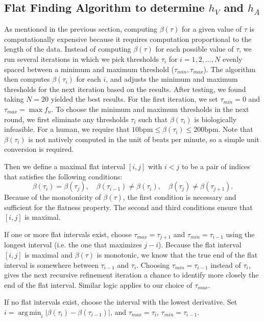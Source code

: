 \documentclass[conference]{IEEEtran}
\newcommand{\APH}{\ensuremath{h_A}}
\newcommand{\VPH}{\ensuremath{h_V}}
\DeclareMathOperator*{\argmin}{arg\,min}
\begin{document}
\subsection{Flat Finding Algorithm to determine \VPH{} and \APH{}}
As mentioned in the previous section, computing $\beta(\tau)$ for a given value of $\tau$
is computationally expensive because it requires computation proportional to the length of the data.
Instead of computing $\beta(\tau)$ for each possible value of $\tau$, we run several iterations in which
we pick thresholds $\tau_i$ for $i = 1, 2, \dots, N$ evenly spaced
between a minimum and maximum threshold ($\tau_{min}, \tau_{max}$).  The algorithm then computes
$\beta(\tau_i)$ for each $i$, and adjusts the minimum and
maximum thresholds for the next iteration based on the
results.
After testing, we found taking $N=20$ yielded the best results.
For the first iteration, we set
$\tau_{min} = 0$ and $\tau_{max} = \max f_n$. 
To choose the minimum and maximum thresholds in
the next round, we first eliminate any thresholds $\tau_i$
such that $\beta(\tau_i)$ is biologically infeasible. 
For a human, we require that $10 \text{bpm} \le \beta(\tau_i) \le 200 \text{bpm}$.
Note that $\beta(\tau_i)$ is not natively computed in the unit of beats per minute, so a simple unit conversion is required.

Then we define a maximal flat interval $[i,j]$ with $i<j$ to be a pair of indices that satisfies the following conditions:
\begin{equation*}
	\beta(\tau_i) = \beta(\tau_j),\quad \beta(\tau_{i-1}) \ne \beta(\tau_i),\quad \beta(\tau_j) \ne \beta(\tau_{j+1}).
\end{equation*}
Because of the monotonicity of $\beta(\tau)$, the first condition is necessary and sufficient for the flatness property.
The second and third conditions ensure that $[i,j]$ is maximal.

If one or more flat intervals exist, choose $\tau_{max} = \tau_{j+1}$ and $\tau_{min}=\tau_{i-1}$ using the longest interval (i.e. the one that maximizes $j-i$).
Because the flat interval $[i,j]$ is maximal and $\beta(\tau)$ is monotonic,
we know that the true end of the flat interval is somewhere between $\tau_{i-1}$ and $\tau_i$. 
Choosing $\tau_{min} = \tau_{i-1}$ instead of $\tau_{i}$, gives the next recursive refinement iteration a chance to identify more closely the end of the flat interval.
Similar logic applies to our choice of $\tau_{max}$.

If no flat intervals exist, choose the interval with the lowest derivative.
Set $i=\argmin_{i} |\beta(\tau_i) - \beta(\tau_{i-1})|$, and  $\tau_{max} = \tau_i$, $\tau_{min} = \tau_{i-1}$.
\end{document}

